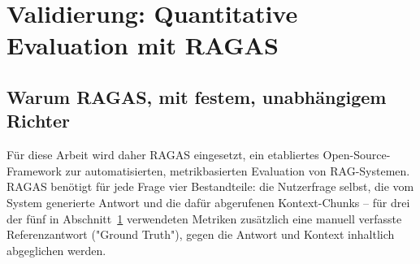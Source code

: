 \documentclass[11pt,a4paper]{article}
\begin{document}
\section{Validierung: Quantitative Evaluation mit RAGAS}
\label{sec:validierung}

\subsection{Warum RAGAS, mit festem, unabhängigem Richter}

Für diese Arbeit wird daher RAGAS
eingesetzt, ein etabliertes Open-Source-Framework zur automatisierten,
metrikbasierten Evaluation von RAG-Systemen. RAGAS benötigt für jede
Frage vier Bestandteile: die Nutzerfrage selbst, die vom System generierte
Antwort und die dafür abgerufenen Kontext-Chunks -- für drei der fünf in
Abschnitt~\ref{sec:validierung} verwendeten Metriken zusätzlich eine
manuell verfasste Referenzantwort ("Ground Truth"), gegen die Antwort und
Kontext inhaltlich abgeglichen werden.
\end{document}

